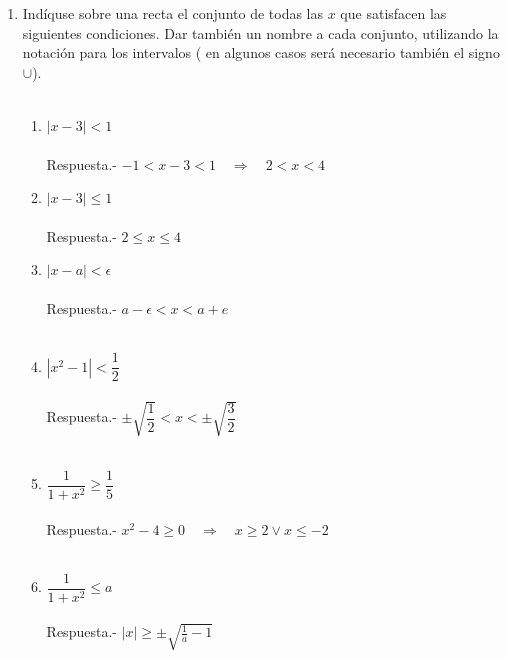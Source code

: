\begin{enumerate}

    \item Indíquse sobre una recta el conjunto de todas las $x$ que satisfacen las siguientes condiciones. Dar también un nombre a cada conjunto, utilizando la notación para los intervalos ( en algunos casos será necesario también el signo $\cup$).\\\\
    \begin{enumerate}[\bfseries (i)]
	
	\item $|x-3| < 1$\\\\
	    Respuesta.-\; $-1< x-3 <1 \quad \Longrightarrow \quad 2 < x < 4$\\

	\item $|x-3|\leq 1$\\\\
	    Respuesta.-\; $2 \leq x \leq 4$\\

	\item $|x-a| < \epsilon$\\\\
	    Respuesta.-\; $a-\epsilon < x < a+e$\\\\
	
	\item $|x^2 - 1| < \dfrac{1}{2}$\\\\
	    Respuesta.-\; $\pm\sqrt{\dfrac{1}{2}} < x < \pm \sqrt{\dfrac{3}{2}}$\\\\

	\item $\dfrac{1}{1+x^2} \geq \dfrac{1}{5}$\\\\
	    Respuesta.-\; $x^2-4\geq 0 \quad \Longrightarrow \quad x\geq 2 \lor x\leq -2$\\\\

	\item $\dfrac{1}{1+x^2} \leq a$\\\\
	    Respuesta.-\; $|x| \geq \pm \sqrt{\frac{1}{a}-1}$\\\\


\end{enumerate}
\end{enumerate}
